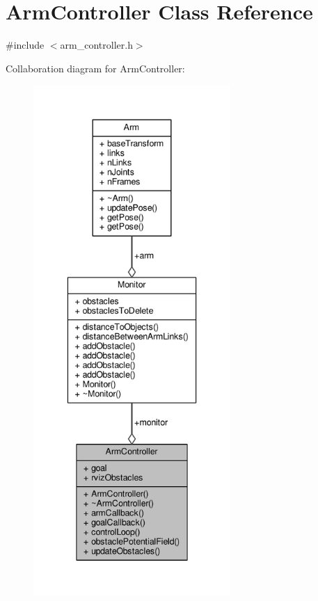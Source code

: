 \hypertarget{class_arm_controller}{}\section{Arm\+Controller Class Reference}
\label{class_arm_controller}


{\ttfamily \#include $<$arm\+\_\+controller.\+h$>$}



Collaboration diagram for Arm\+Controller\+:\nopagebreak
\begin{figure}[H]
\begin{center}
\leavevmode
\includegraphics[height=550pt]{class_arm_controller__coll__graph}
\end{center}
\end{figure}
